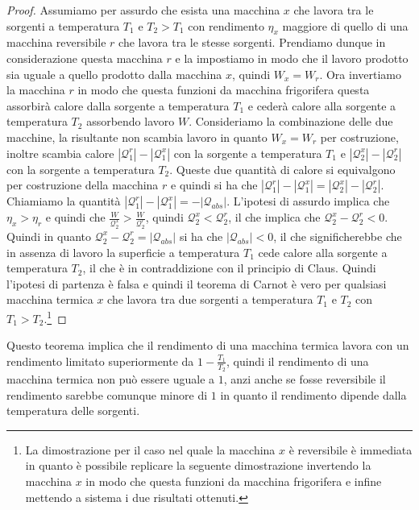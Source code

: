     \begin{proof}
        Assumiamo per assurdo che esista una macchina $x$ che lavora tra le sorgenti a temperatura $T_1$ e $T_2>T_1$ con rendimento $\eta_x$ maggiore di quello di una macchina reversibile $r$ che lavora tra le stesse sorgenti. Prendiamo dunque in considerazione questa macchina $r$ e la impostiamo in modo che il lavoro prodotto sia uguale a quello prodotto dalla macchina $x$, quindi $W_x = W_r$. Ora invertiamo la macchina $r$ in modo che questa funzioni da macchina frigorifera questa assorbirà calore dalla sorgente a temperatura $T_1$ e cederà calore alla sorgente a temperatura $T_2$ assorbendo lavoro $W$. Consideriamo la combinazione delle due macchine, la risultante non scambia lavoro in quanto $W_x = W_r$ per costruzione, inoltre scambia calore $\left|\mathcal{Q}_1^r\right|-\left|\mathcal{Q}_1^x\right|$ con la sorgente a temperatura $T_1$ e $\left|\mathcal{Q}_2^x\right|-\left|\mathcal{Q}_2^r\right|$ con la sorgente a temperatura $T_2$. Queste due quantità di calore si equivalgono per costruzione della macchina $r$ e quindi si ha che $\left|\mathcal{Q}_1^r\right|-\left|\mathcal{Q}_1^x\right| = \left|\mathcal{Q}_2^x\right|-\left|\mathcal{Q}_2^r\right|$. Chiamiamo la quantità $\left|\mathcal{Q}_1^r\right|-\left|\mathcal{Q}_1^x\right| = -\left|\mathcal{Q}_{abs}\right|$. L'ipotesi di assurdo implica che $\eta_x > \eta_r$ e quindi che $\frac{W}{\mathcal{Q}_2^x} > \frac{W}{\mathcal{Q}_2^r}$, quindi $\mathcal{Q}_2^x < \mathcal{Q}_2^r$, il che implica che $\mathcal{Q}_2^x-\mathcal{Q}_2^r < 0$. Quindi in quanto $\mathcal{Q}_2^x-\mathcal{Q}_2^r = \left|\mathcal{Q}_{abs}\right|$ si ha che $\left|\mathcal{Q}_{abs}\right| < 0$, il che significherebbe che in assenza di lavoro la superficie a temperatura $T_1$ cede calore alla sorgente a temperatura $T_2$, il che è in contraddizione con il principio di Claus. Quindi l'ipotesi di partenza è falsa e quindi il teorema di Carnot è vero per qualsiasi macchina termica $x$ che lavora tra due sorgenti a temperatura $T_1$ e $T_2$ con $T_1 > T_2$.\footnote{La dimostrazione per il caso nel quale la macchina $x$ è reversibile è immediata in quanto è possibile replicare la seguente dimostrazione invertendo la macchina $x$ in modo che questa funzioni da macchina frigorifera e infine mettendo a sistema i due risultati ottenuti.}
    \end{proof}
    Questo teorema implica che il rendimento di una macchina termica lavora con un rendimento limitato superiormente da $1-\frac{T_1}{T_2}$, quindi il rendimento di una macchina termica non può essere uguale a $1$, anzi anche se fosse reversibile il rendimento sarebbe comunque minore di $1$ in quanto il rendimento dipende dalla temperatura delle sorgenti.
